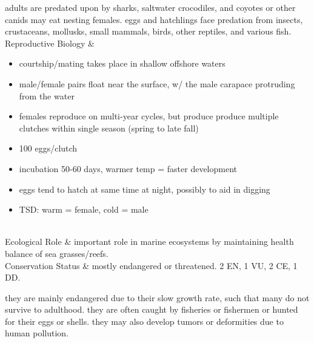 \begin{center}
\begin{longtabu}
	adults are predated upon by sharks, saltwater crocodiles, and coyotes or other canids may eat nesting females. eggs and hatchlings face predation from insects, crustaceans, mollusks, small mammals, birds, other reptiles, and various fish.
	\\
	\hline
	Reproductive Biology & 
	\begin{itemize}[noitemsep]
		\item courtship/mating takes place in shallow offshore waters
		\item male/female pairs float near the surface, w/ the male carapace protruding from the water
		\item females reproduce on multi-year cycles, but produce produce multiple clutches within single season (spring to late fall)
		\item 100 eggs/clutch
		\item incubation 50-60 days, warmer temp = faster development
		\item eggs tend to hatch at same time at night, possibly to aid in digging
		\item TSD: warm = female, cold = male
	\end{itemize}
	\\
	\hline
	Ecological Role &
	important role in marine ecosystems by maintaining health balance of sea grasses/reefs.
	\\
	\hline
	Conservation Status & 
	mostly endangered or threatened. 2 EN, 1 VU, 2 CE, 1 DD.
	
	they are mainly endangered due to their slow growth rate, such that many do not survive to adulthood. they are often caught by fisheries or fishermen or hunted for their eggs or shells. they may also develop tumors or deformities due to human pollution.
	\\
	\hline
\end{longtabu}
\end{center}
